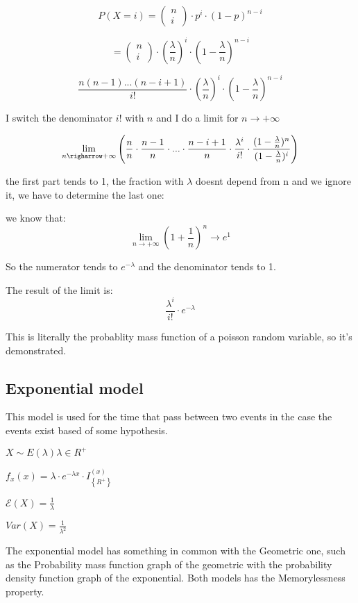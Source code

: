\documentclass{article}
\begin{document}
$$P(X=i) = \left(\begin{array}{c} n \\ i \end{array} \right) \cdot p^i \cdot (1-p)^{n-i}$$

$$= \left(\begin{array}{c} n \\ i \end{array} \right) \cdot (\frac{\lambda}{n})^i \cdot (1 - \frac{\lambda}{n})^{n-i}$$

$$\frac{n(n-1)...(n-i+1)}{i!} \cdot (\frac{\lambda}{n})^i \cdot (1 - \frac{\lambda}{n})^{n-i}$$

I switch the denominator $i!$ with $n$ and I do a limit for $n \rightarrow + \infty$ 

$$\lim_{n \righarrow + \infty} \left(\frac{n}{n} \cdot \frac{n-1}{n} \cdot ... \cdot \frac{n - i + 1}{n} \cdot \frac{\lambda^i}{i!} \cdot \frac{(1 - \frac{\lambda}{n})^n}{(1 - \frac{\lambda}{n})^i}\right)$$

the first part tends to 1, the fraction with $\lambda$ doesnt depend from n and we ignore it, we have to determine the last one:
\bigskip

we know that: $$\lim_{n \rightarrow + \infty} (1 + \frac{1}{n})^n \rightarrow e^1$$

So the numerator tends to $e^{- \lambda}$ and the denominator tends to 1.

The result of the limit is: $$\frac{\lambda^i}{i!} \cdot e^{- \lambda}$$

This is literally the probablity mass function of a poisson random variable, so it's demonstrated.

\subsection{Exponential model}

This model is used for the time that pass between two events in the case the events exist based of some hypothesis.

$X \sim E(\lambda) \lambda \in R^+$
\bigskip

$f_x(x) = \lambda \cdot e^{- \lambda x} \cdot I_\left\{R^+\right\}^(x)$
\bigskip

$\mathcal E(X) = \frac{1}{\lambda}$

$Var(X) = \frac{1}{\lambda^2}$
\bigskip


The exponential model has something in common with the Geometric one, such as the Probability mass function graph of the geometric with the probability density function graph of the exponential. Both models has the Memorylessness property.
\bigskip
\end{document}
